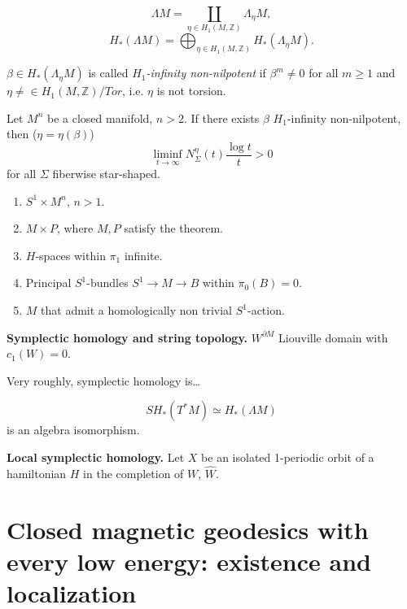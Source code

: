 \noindent
$$
\Lambda M
=
\coprod_{\eta \in H_1(M,\mathbb{Z})}
\Lambda_\eta M,
$$
$$
H_*(\Lambda M) =
\bigoplus_{\eta \in H_1(M,\mathbb{Z})}
H_*(\Lambda_\eta M).
$$

\begin{definition}
\label{definition-h-inf-non-nilpotent}
$\beta \in H_*(\Lambda_\eta M)$
is called {\it $H_1$-infinity non-nilpotent} 
if $\beta^m \neq  0$ for all $m \geq  1$
and $\eta \neq  \in H_1(M,\mathbb{Z})/Tor$,
i.e. $\eta $ is not torsion.
\end{definition}

\begin{theorem}[F-Pering]
\label{theorem-f-pering}
Let $M^n$ be a closed manifold,
$n>2$. If there exists $\beta$
$H_1$-infinity non-nilpotent, then
($\eta=\eta(\beta)$)
$$
\operatorname{lim inf}_{t \to \infty}
N^\eta_\Sigma(t)
\frac{\operatorname{log}t}{t}>0
$$
for all $\Sigma$ fiberwise star-shaped.
\end{theorem}

\begin{example}
\label{example-f-pering}
\begin{enumerate}
\item $S^1 \times M^n$, $n>1$.
\item $M \times P$, where $M,P$ satisfy the
theorem.
\item $H$-spaces within $\pi_1$ infinite.
\item Principal $S^1$-bundles
$S^1 \to M \to B$ within
$\pi_0(B) = 0$.
\item $M$ that admit a homologically non
trivial $S^1$-action.
\end{enumerate}
\end{example}

\medskip\noindent
{\bf Symplectic homology and string
topology.} $W^{\partial M}$ Liouville domain
with $c_1(W) =0$.

Very roughly, symplectic homology is…

\begin{theorem}[A-S]
\label{theorem-as}
$$
SH_*(T^*M) \simeq
H_*(\Lambda M)
$$
is an algebra isomorphism.
\end{theorem}

\medskip\noindent
{\bf Local symplectic homology.}
Let $X$ be an isolated 1-periodic orbit
of a hamiltonian $H$ in the completion of
$W$, $\hat{W}$.



\section{Closed magnetic geodesics with every
low energy: existence and localization}
\label{section-magnetic-geodesics-low-energy}

